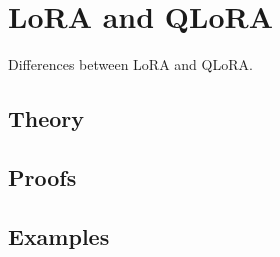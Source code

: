 
\section{LoRA and QLoRA}
\label{sec:2.5.09-lora-qlora}

\begin{ticket}
Differences between LoRA and QLoRA.
\end{ticket}

\subsection*{Theory}

\subsection*{Proofs}

\subsection*{Examples}
